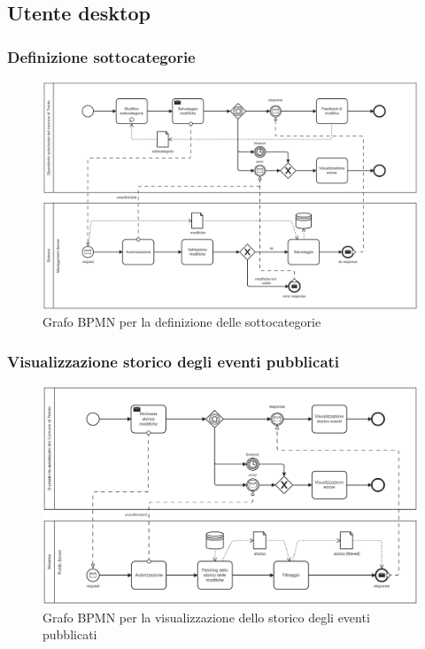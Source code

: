 \documentclass{article}
\begin{document}
\subsection{Utente desktop}

\subsubsection{Definizione sottocategorie}

\begin{figure}[htbp]
    \label{7.2.1}
    \centering
    \includegraphics[width=1\textwidth]{Images/BPMN - sottocategorie.png}
    \caption{Grafo BPMN per la definizione delle sottocategorie}
\end{figure}
\clearpage

\subsubsection{Visualizzazione storico degli eventi pubblicati}

\begin{figure}[htbp]
    \label{7.2.2}
    \centering
    \includegraphics[width=1\textwidth]{Images/BPMN - storico.png}
    \caption{Grafo BPMN per la visualizzazione dello storico degli eventi pubblicati}
\end{figure}
\clearpage
\end{document}
